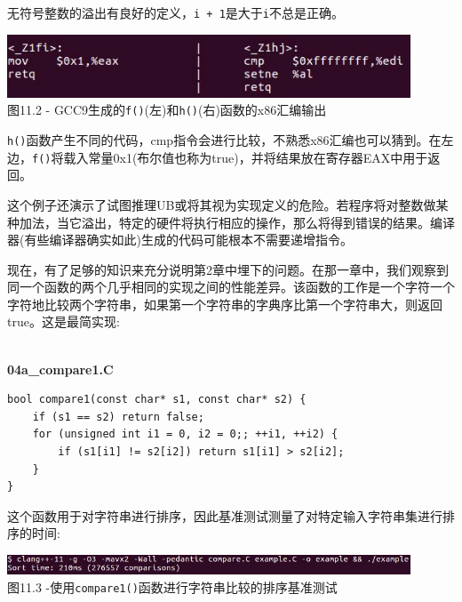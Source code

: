 无符号整数的溢出有良好的定义，\texttt{i + 1}是大于\texttt{i}不总是正确。

\begin{center}
\includegraphics[width=0.9\textwidth]{content/3/chapter11/images/2.jpg}\\
图11.2 - GCC9生成的\texttt{f()}(左)和\texttt{h()}(右)函数的x86汇编输出
\end{center}

\texttt{h()}函数产生不同的代码，cmp指令会进行比较，不熟悉x86汇编也可以猜到。在左边，\texttt{f()}将载入常量0x1(布尔值也称为true)，并将结果放在寄存器EAX中用于返回。 

这个例子还演示了试图推理UB或将其视为实现定义的危险。若程序将对整数做某种加法，当它溢出，特定的硬件将执行相应的操作，那么将得到错误的结果。编译器(有些编译器确实如此)生成的代码可能根本不需要递增指令。

现在，有了足够的知识来充分说明第2章中埋下的问题。在那一章中，我们观察到同一个函数的两个几乎相同的实现之间的性能差异。该函数的工作是一个字符一个字符地比较两个字符串，如果第一个字符串的字典序比第一个字符串大，则返回true。这是最简实现:

\hspace*{\fill} \\ %
\noindent
\textbf{04a\_compare1.C}
\begin{lstlisting}[style=styleCXX]
bool compare1(const char* s1, const char* s2) {
	if (s1 == s2) return false;
	for (unsigned int i1 = 0, i2 = 0;; ++i1, ++i2) {
		if (s1[i1] != s2[i2]) return s1[i1] > s2[i2];
	}
}
\end{lstlisting}

这个函数用于对字符串进行排序，因此基准测试测量了对特定输入字符串集进行排序的时间:

\begin{center}
\includegraphics[width=0.9\textwidth]{content/3/chapter11/images/3.jpg}\\
图11.3 -使用\texttt{compare1()}函数进行字符串比较的排序基准测试
\end{center}

